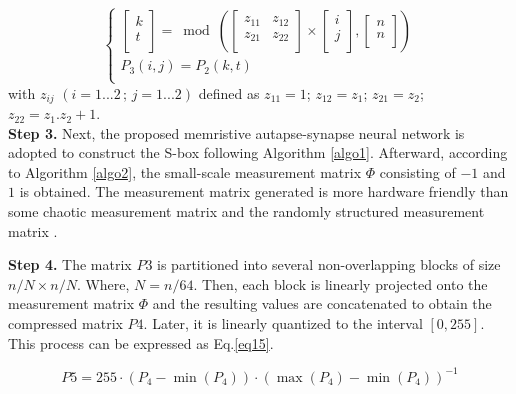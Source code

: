 \documentclass[journal]{IEEEtran/IEEEtran}
\begin{document}
\begin{equation}\label{eq10}
\left\{ {\begin{array}{*{20}{c}}
   {\left[ {\begin{array}{*{20}{c}}
   k  \\
   t  \\
\end{array}} \right] = \bmod \left( {\left[ {\begin{array}{*{20}{c}}
   {{z_{11}}} & {{z_{12}}}  \\
   {{z_{21}}} & {{z_{22}}}  \\
\end{array}} \right] \times \left[ {\begin{array}{*{20}{c}}
   i  \\
   j  \\
\end{array}} \right],\left[ {\begin{array}{*{20}{c}}
   n  \\
   n  \\
\end{array}} \right]} \right)}  \\
   {{P_3}(i,j) = {P_2}(k,t)}  \\
\end{array}} \right. 
\end{equation}
with ${z_{ij}}\,\,(i = 1...2\,;\,j = 1...2)$ defined as ${z_{11}} = 1$; ${z_{12}}={z_1}$; ${z_{21}} = {z_2}$; ${z_{22}} = {z_1}.{z_2} + 1$.\\

\textbf{Step 3.} Next, the proposed memristive autapse-synapse neural network is adopted to construct the S-box following Algorithm \ref{algo1}. Afterward, according to Algorithm \ref{algo2}, the small-scale measurement matrix $\Phi$   consisting of $-1$  and $1$ is obtained. The measurement matrix generated is more hardware friendly than some chaotic measurement matrix and the randomly structured measurement matrix \cite{canh2021restricted}.


\textbf{Step 4.} The matrix  $P3$ is partitioned into several non-overlapping blocks of size  $n/N \times n/N$. Where, $N=n/64$. Then, each block is linearly projected onto the measurement matrix $\Phi$  and the resulting values are concatenated to obtain the compressed matrix  $P4$. Later, it is linearly quantized to the interval $[0,255]$. This process can be expressed as Eq.\ref{eq15}.

\begin{equation}\label{eq15}
P 5=255 \cdot\left(P_{4}-\min \left(P_{4}\right)\right) \cdot\left(\max \left(P_{4}\right)-\min \left(P_{4}\right)\right)^{-1}
\end{equation}
\end{document}
